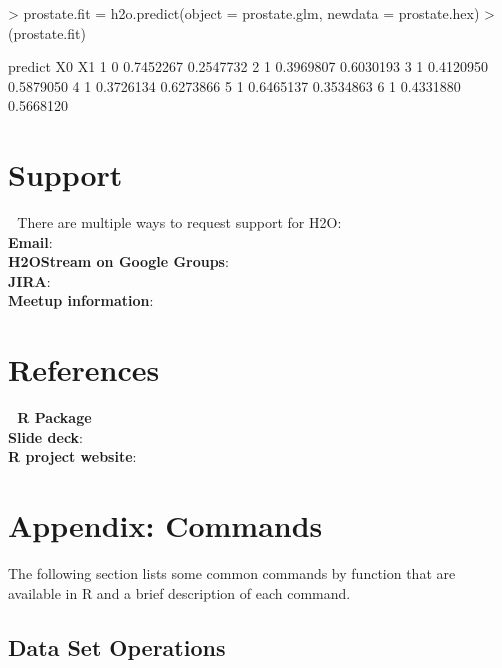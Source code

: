 \documentclass[11pt]{article}
\begin{document}
\begin{enumerate}
\begin{spverbatim}
> prostate.fit = h2o.predict(object = prostate.glm, newdata = prostate.hex)
> (prostate.fit)

predict        X0        X1
      1       0 0.7452267 0.2547732
      2       1 0.3969807 0.6030193
      3       1 0.4120950 0.5879050
      4       1 0.3726134 0.6273866
      5       1 0.6465137 0.3534863
      6       1 0.4331880 0.5668120
\end{spverbatim}


\section{Support} 
There are multiple ways to request support for H2O: \\

\textbf{Email}: \\

\textbf{H2OStream on Google Groups}: \\

\textbf{JIRA}: \\

\textbf{Meetup information}: \\

\section{References} 
\textbf{R Package} \\

\textbf{Slide deck}: \\

\textbf{R project website}: 


\section{Appendix: Commands} 
\label{Appendix}

The following section lists some common commands by function that are available in R and a brief description of each command. 


\subsection{Data Set Operations}


\end{enumerate}
\end{document}
